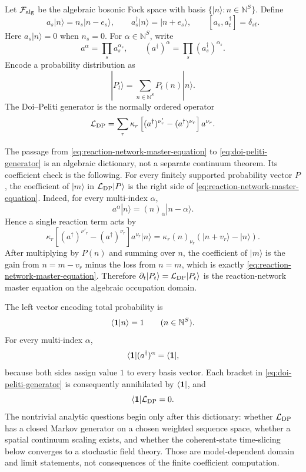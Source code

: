 Let \(\mathcal F_{\rm alg}\) be the algebraic bosonic Fock space with basis
\(\{|n\rangle:n\in\mathbb N^S\}\).  Define
\[
  a_s|n\rangle=n_s|n-e_s\rangle,
  \qquad
  a_s^\dagger|n\rangle=|n+e_s\rangle,
  \qquad
  [a_s,a_t^\dagger]=\delta_{st}.
\]
Here \(a_s|n\rangle=0\) when \(n_s=0\).
For \(\alpha\in\mathbb N^S\), write
\[
  a^\alpha=\prod_s a_s^{\alpha_s},
  \qquad
  (a^\dagger)^\alpha=\prod_s(a_s^\dagger)^{\alpha_s}.
\]
Encode a probability distribution as
\[
  |P_t\rangle=\sum_{n\in\mathbb N^S}P_t(n)|n\rangle .
\]
The Doi--Peliti generator is the normally ordered operator
\begin{equation}
  \mathcal L_{\rm DP}
  =
  \sum_r
  \kappa_r
  \left[
    (a^\dagger)^{\nu'_r}
    -
    (a^\dagger)^{\nu_r}
  \right]
  a^{\nu_r}.
  \label{eq:doi-peliti-generator}
\end{equation}

The passage from \eqref{eq:reaction-network-master-equation} to
\eqref{eq:doi-peliti-generator} is an algebraic dictionary, not a separate
continuum theorem.  Its coefficient check is the following.  For every
finitely supported probability vector \(P\), the coefficient of \(|m\rangle\)
in \(\mathcal L_{\rm DP}|P\rangle\) is the right side of
\eqref{eq:reaction-network-master-equation}.  Indeed, for every multi-index
\(\alpha\),
\begin{equation}
  a^\alpha|n\rangle=(n)_\alpha|n-\alpha\rangle .
  \label{eq:doi-peliti-falling-factorial-action}
\end{equation}
Hence a single reaction term acts by
\begin{equation}
  \kappa_r
  \left[
    (a^\dagger)^{\nu'_r}
    -
    (a^\dagger)^{\nu_r}
  \right]
  a^{\nu_r}|n\rangle
  =
  \kappa_r(n)_{\nu_r}
  \left(|n+v_r\rangle-|n\rangle\right).
  \label{eq:doi-peliti-single-reaction-action}
\end{equation}
After multiplying by \(P(n)\) and summing over \(n\), the coefficient of
\(|m\rangle\) is the gain from \(n=m-v_r\) minus the loss from \(n=m\),
which is exactly \eqref{eq:reaction-network-master-equation}.  Therefore
\(\partial_t|P_t\rangle=\mathcal L_{\rm DP}|P_t\rangle\) is the
reaction-network master equation on the algebraic occupation domain.

The left vector encoding total probability is
\[
  \langle{\bf 1}|n\rangle=1\qquad(n\in\mathbb N^S).
\]
For every multi-index \(\alpha\),
\[
  \langle{\bf 1}|(a^\dagger)^\alpha=\langle{\bf 1}|,
\]
because both sides assign value \(1\) to every basis vector.  Each bracket in
\eqref{eq:doi-peliti-generator} is consequently annihilated by
\(\langle{\bf 1}|\), and
\begin{equation}
  \langle{\bf 1}|\mathcal L_{\rm DP}=0 .
  \label{eq:doi-peliti-probability-conservation-left-vector}
\end{equation}
The nontrivial analytic questions begin only after this dictionary: whether
\(\mathcal L_{\rm DP}\) has a closed Markov generator on a chosen weighted
sequence space, whether a spatial continuum scaling exists, and whether the
coherent-state time-slicing below converges to a stochastic field theory.
Those are model-dependent domain and limit statements, not consequences of
the finite coefficient computation.


